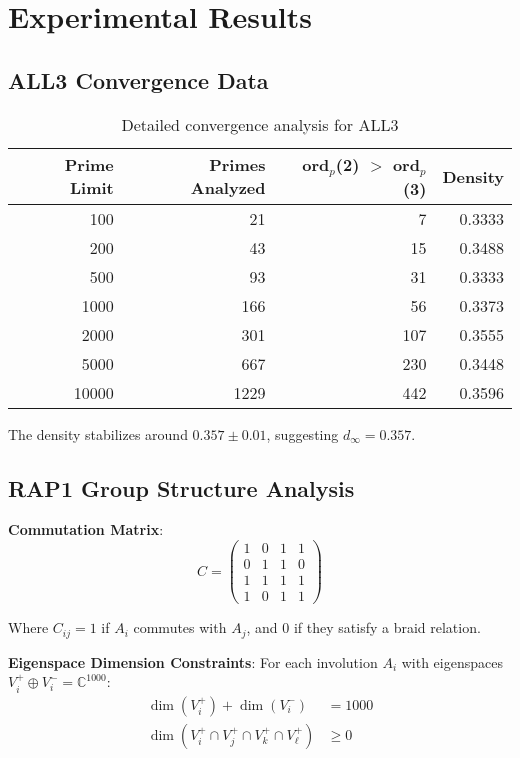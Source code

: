 \documentclass[11pt]{article}
\begin{document}
\section{Experimental Results}

\subsection{ALL3 Convergence Data}

\begin{table}[H]
\centering
\begin{tabular}{@{}rrrr@{}}
\toprule
Prime Limit & Primes Analyzed & ord$_p$(2) $>$ ord$_p$(3) & Density \\
\midrule
100 & 21 & 7 & 0.3333 \\
200 & 43 & 15 & 0.3488 \\
500 & 93 & 31 & 0.3333 \\
1000 & 166 & 56 & 0.3373 \\
2000 & 301 & 107 & 0.3555 \\
5000 & 667 & 230 & 0.3448 \\
10000 & 1229 & 442 & 0.3596 \\
\bottomrule
\end{tabular}
\caption{Detailed convergence analysis for ALL3}
\end{table}

The density stabilizes around $0.357 \pm 0.01$, suggesting $d_{\infty} = 0.357$.

\subsection{RAP1 Group Structure Analysis}

\textbf{Commutation Matrix}:
\begin{equation}
C = \begin{pmatrix}
1 & 0 & 1 & 1 \\
0 & 1 & 1 & 0 \\
1 & 1 & 1 & 1 \\
1 & 0 & 1 & 1
\end{pmatrix}
\end{equation}

Where $C_{ij} = 1$ if $A_i$ commutes with $A_j$, and $0$ if they satisfy a braid relation.

\textbf{Eigenspace Dimension Constraints}:
For each involution $A_i$ with eigenspaces $V_i^+ \oplus V_i^- = \mathbb{C}^{1000}$:
\begin{align}
\dim(V_i^+) + \dim(V_i^-) &= 1000 \\
\dim(V_i^+ \cap V_j^+ \cap V_k^+ \cap V_\ell^+) &\geq 0
\end{align}
\end{document}
